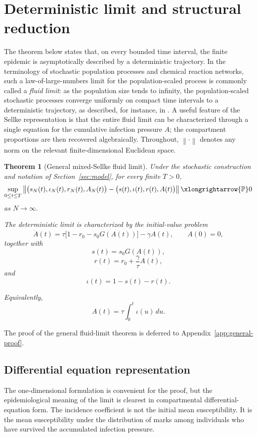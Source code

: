 \documentclass[pdflatex,sn-mathphys-ay]{sn-jnl}
\theoremstyle{thmstyleone}
\newtheorem{theorem}{Theorem}
\theoremstyle{thmstyletwo}
\theoremstyle{thmstylethree}
\newcommand{\Pp}{\mathbb{P}}
\begin{document}
\section{Deterministic limit and structural reduction}\label{sec:limit}

The theorem below states that, on every bounded time interval, the finite epidemic is asymptotically described by a deterministic trajectory. In the terminology of stochastic population processes and chemical reaction networks, such a law-of-large-numbers limit for the population-scaled process is commonly called a \emph{fluid limit}: as the population size tends to infinity, the  population-scaled stochastic processes converge uniformly on compact time intervals to a deterministic trajectory, as described, for instance, in  \cite{EthierKurtz1986, AndersonKurtz2015}. A useful feature of the Sellke representation is that the entire fluid limit can be characterized through a single
equation for the cumulative infection pressure $A$; the compartment proportions are then recovered algebraically. Throughout, $\left\|\cdot\right\|$  denotes any norm on the relevant finite-dimensional Euclidean space.



\begin{theorem}[General mixed-Sellke fluid limit]\label{thm:1}
Under the stochastic construction and notation of Section~\ref{sec:model}, for every finite \(T>0\),
\[
\sup_{0\leq t\leq T}
\left\|
\bigl(s_N(t),\iota_N(t),r_N(t),A_N(t)\bigr)
-
\bigl(s(t),\iota(t),r(t),A(t)\bigr)
\right\|
\xlongrightarrow{\Pp}0
\]
as $N\to\infty.$

The deterministic limit is characterized by the  initial-value problem
\[
\dot A(t)
=
\tau\bigl[1-r_0-s_0G(A(t))\bigr]
-\gamma A(t),
\qquad
A(0)=0,
\]
together with
\[
s(t)=s_0G(A(t)),
\]
\[
r(t)=r_0+\frac{\gamma}{\tau}A(t),
\]
and
\[
\iota(t)=1-s(t)-r(t).
\]

Equivalently,
\[
A(t)=\tau\int_0^t\iota(u)\,du.
\]
\end{theorem}

The proof of the general fluid-limit theorem is deferred to Appendix~\ref{app:general-proof}.

\subsection{Differential equation representation}

The one-dimensional  formulation is convenient for the proof, but the epidemiological
meaning of the limit is clearest in compartmental differential-equation form. The incidence
coefficient is not the initial mean susceptibility. It is the mean
susceptibility under the distribution of marks among individuals who have
survived the accumulated infection pressure.
\end{document}
